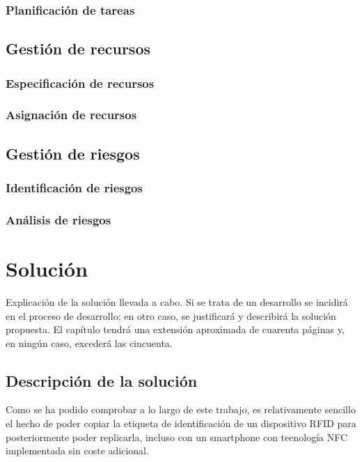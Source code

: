 \documentclass[12pt,a4paper,onecolumn,oneside]{report}
\begin{document}
\subsection{Planificación de tareas}



\section{Gestión de recursos}

\subsection{Especificación de recursos}

\subsection{Asignación de recursos}




\section{Gestión de riesgos}

\subsection{Identificación de riesgos}

\subsection{Análisis de riesgos}



\chapter{Solución}
\label{Solución}

Explicación de la solución llevada a cabo. Si se trata de un desarrollo se incidirá en el proceso de desarrollo; en otro caso, se justificará y describirá la solución propuesta. El capítulo tendrá una extensión aproximada de cuarenta páginas y, en ningún caso, excederá las cincuenta.

\section{Descripción de la solución}

Como se ha podido comprobar a lo largo de este trabajo, es relativamente sencillo el hecho de poder copiar la etiqueta de identificación de un dispositivo RFID para posteriormente poder replicarla, incluso con un smartphone con tecnología NFC implementada sin coste adicional.
\end{document}
